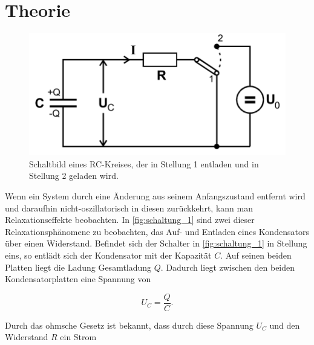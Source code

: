 \section{Theorie}
\label{sec:Theorie}




\begin{figure}
    \centering
    \includegraphics[width=\textwidth/2]{images/schaltung_1.png}
    \caption{Schaltbild eines RC-Kreises, der in Stellung 1 entladen und in Stellung 2 geladen wird. \cite{V353}}
    \label{fig:schaltung_1}
\end{figure}

Wenn ein System durch eine Änderung aus seinem Anfangszustand entfernt wird und daraufhin nicht-oszillatorisch in diesen zurückkehrt, kann man Relaxationseffekte beobachten. In \autoref{fig:schaltung_1} sind zwei dieser Relaxationsphänomene zu beobachten, das Auf- und Entladen eines Kondensators über einen Widerstand. 
Befindet sich der Schalter in \autoref{fig:schaltung_1} in Stellung eins, so entlädt sich der Kondensator mit der Kapazität $C$. Auf seinen beiden Platten liegt die Ladung Gesamtladung $Q$. Dadurch liegt zwischen den beiden Kondensatorplatten eine Spannung von 

\begin{equation}
    \label{eq:kondensatorspannung}
    U_C = \frac{Q}{C}.
\end{equation}

Durch das ohmsche Gesetz ist bekannt, dass durch diese Spannung $U_C$ und den Widerstand $R$ ein Strom 

